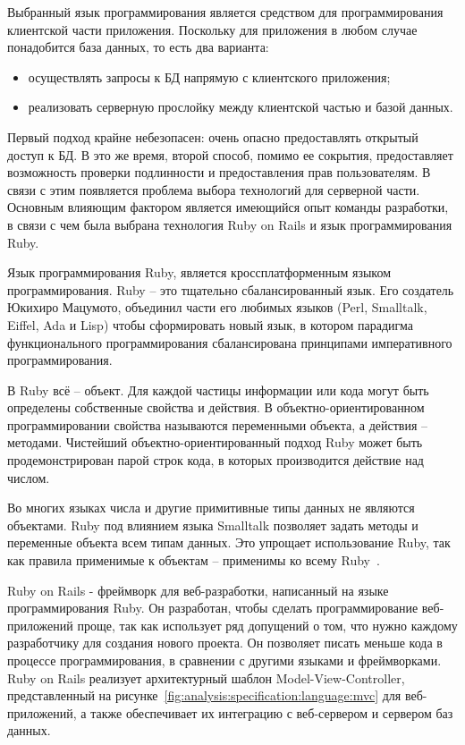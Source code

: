 Выбранный язык программирования является средством для программирования клиентской части приложения.
Поскольку для приложения в любом случае понадобится база данных, то есть два варианта:

\begin{itemize}
	\item осуществлять запросы к БД напрямую с клиентского приложения;
	\item реализовать серверную прослойку между клиентской частью и базой данных.
\end{itemize}

Первый подход крайне небезопасен: очень опасно предоставлять открытый доступ к БД. В это же время, второй способ,
помимо ее сокрытия, предоставляет возможность проверки подлинности и предоставления прав пользователям.
В связи с этим появляется проблема выбора технологий для серверной части. Основным влияющим фактором является
имеющийся опыт команды разработки, в связи с чем была выбрана технология Ruby on Rails и язык программирования Ruby.

Язык программирования Ruby, является кроссплатформенным языком программирования. Ruby -- это тщательно сбалансированный
язык. Его создатель Юкихиро Мацумото, объединил части его любимых языков (Perl, \linebreak Smalltalk, Eiffel, Ada и Lisp) чтобы
сформировать новый язык, в котором парадигма функционального программирования сбалансирована принципами
императивного программирования. 

В Ruby всё -- объект. Для каждой частицы информации или кода могут быть определены собственные свойства и действия.
В объектно-ориентирован\-ном программировании свойства называются переменными объекта, а действия – методами.
Чистейший объектно-ориентированный подход Ruby может быть продемонстрирован парой строк кода, в которых производится
действие над числом.

Во многих языках числа и другие примитивные типы данных не являются объектами. Ruby под влиянием языка Smalltalk
позволяет задать методы и переменные объекта всем типам данных. Это упрощает использование Ruby, так как правила
применимые к объектам -- применимы ко всему Ruby~\cite{ruby}.

Ruby on Rails - фреймворк для веб-разработки, написанный на языке программирования Ruby. Он разработан, чтобы сделать
программирование веб-приложений проще, так как использует ряд допущений о том, что нужно каждому разработчику для
создания нового проекта. Он позволяет писать меньше кода в процессе программирования, в сравнении с другими языками и
фреймворками. Ruby on Rails реализует архитектурный шаблон Model-View-Controller, представленный на
рисунке~\ref{fig:analysis:specification:language:mvc} для веб-приложений, а также
обеспечивает их интеграцию с веб-сервером и сервером баз данных.

